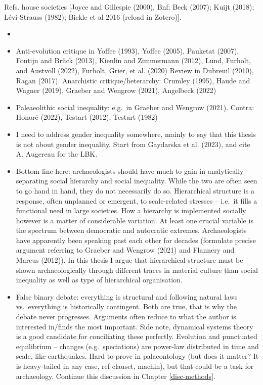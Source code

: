 \documentclass[
  12pt,
  a4paper, twoside]{book}
\providecommand{\tightlist}{%
  \setlength{\itemsep}{0pt}\setlength{\parskip}{0pt}}
\begin{document}
Refs. house societies {[}Joyce and Gillespie (2000), Bnf; Beck (2007); Kuijt (2018); Lévi-Strauss (1982); Bickle et al 2016 (reload in Zotero){]}.

\begin{itemize}
\tightlist
\item
\end{itemize}

\begin{itemize}
\tightlist
\item
  Anti-evolution critique in Yoffee (1993), Yoffee (2005), Pauketat (2007), Fontijn and Brück (2013), Kienlin and Zimmermann (2012), Lund, Furholt, and Austvoll (2022), Furholt, Grier, et al. (2020) Review in Dubreuil (2010), Ragan (2017). Anarchistic critique/heterarchy: Crumley (1995), Haude and Wagner (2019), Graeber and Wengrow (2021), Angelbeck (2022)
\item
  Paleaeolithic social inequality: e.g.~in Graeber and Wengrow (2021). Contra: Honoré (2022), Testart (2012), Testart (1982)
\item
  I need to address gender inequality somewhere, mainly to say that this thesis is not about gender inequality. Start from Gaydarska et al. (2023), and cite A. Augereau for the LBK.
\item
  Bottom line here: archaeologists should have much to gain in analytically separating social hierarchy and social inequality. While the two are often seen to go hand in hand, they do not necessarily do so. Hierarchical structure is a response, often unplanned or emergent, to scale-related stresses -- i.e.~it fills a functional need in large societies. How a hierarchy is implemented socially however is a matter of considerable variation. At least one crucial variable is the spectrum between democratic and autocratic extremes. Archaeologists have apparently been speaking past each other for decades (formulate precise argument referring to Graeber and Wengrow (2021) and Flannery and Marcus (2012)). In this thesis I argue that hierarchical structure must be shown archaeologically through different traces in material culture than social inequality as well as type of hierarchical organisation.
\item
  False binary debate: everything is structural and following natural laws vs.~everything is historically contingent. Both are true, that is why the debate never progresses. Arguments often reduce to what the author is interested in/finds the most important. Side note, dynamical systems theory is a good candidate for conciliating these perfectly. Evolution and punctuated equilibrium -- changes (e.g.~speciations) are power-law distributed in time and scale, like earthquakes. Hard to prove in palaeontology (but does it matter? It is heavy-tailed in any case, ref clauset, machin), but that could be a task for archaeology. Continue this discussion in Chapter \ref{disc-methods}.
\end{itemize}
\end{document}
